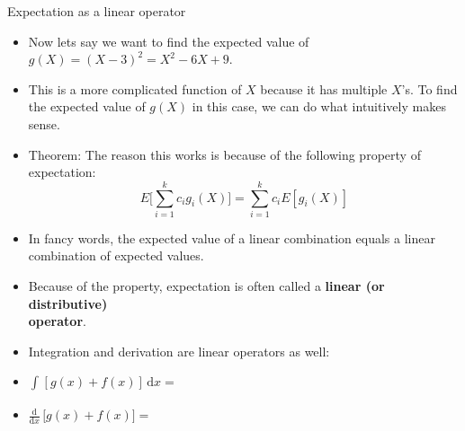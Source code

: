 \documentclass{article}
\newcommand{\integral}[4]{\displaystyle \int_{#1}^{#2} #3 \,\mathrm{d} #4}		%
\newcommand{\ddx}[1]{\frac{\mathrm{d}}{\mathrm{d} #1}\,}		%
\begin{document}
Expectation as a linear operator\bigskip
\begin{itemize}
    \item Now lets say we want to find the expected value of $g(X) = (X - 3)^2 = X^2 -6X + 9$.
    \item[] This is a more complicated function of $X$ because it has multiple $X$'s. To find the expected value of $g(X)$ in this case, we can do what intuitively makes sense.\vspace{80pt}
    \item Theorem: The reason this works is because of the following property of expectation:
    \[E\bigg[\sum_{i = 1}^k c_i g_i(X)\bigg] = \sum_{i = 1}^k c_i E[g_i(X)]\]
    \item[] In fancy words, the expected value of a linear combination equals a linear combination of expected values.
    \item Because of the property, expectation is often called a \textbf{linear (or distributive) \\operator}.
    \item[] Integration and derivation are linear operators as well:
    \item[] $\integral{}{}{[g(x) + f(x)]}{x} = $
    \item[] $\ddx{x} \big[g(x) + f(x)] = $
\end{itemize}\newpage
\end{document}
